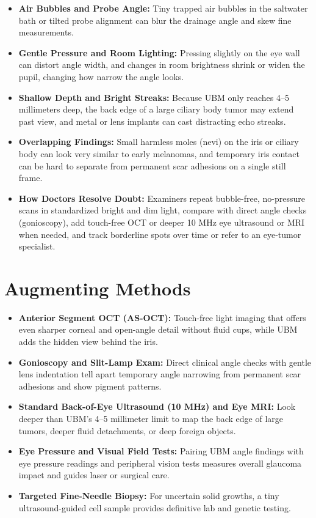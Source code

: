 \begin{itemize}
    \item \textbf{Air Bubbles and Probe Angle:} Tiny trapped air bubbles in the saltwater bath or tilted probe alignment can blur the drainage angle and skew fine measurements.
    \item \textbf{Gentle Pressure and Room Lighting:} Pressing slightly on the eye wall can distort angle width, and changes in room brightness shrink or widen the pupil, changing how narrow the angle looks.
    \item \textbf{Shallow Depth and Bright Streaks:} Because UBM only reaches 4--5 millimeters deep, the back edge of a large ciliary body tumor may extend past view, and metal or lens implants can cast distracting echo streaks.
    \item \textbf{Overlapping Findings:} Small harmless moles (nevi) on the iris or ciliary body can look very similar to early melanomas, and temporary iris contact can be hard to separate from permanent scar adhesions on a single still frame.
    \item \textbf{How Doctors Resolve Doubt:} Examiners repeat bubble-free, no-pressure scans in standardized bright and dim light, compare with direct angle checks (gonioscopy), add touch-free OCT or deeper 10 MHz eye ultrasound or MRI when needed, and track borderline spots over time or refer to an eye-tumor specialist.
\end{itemize}

\section{Augmenting Methods}

\begin{itemize}
    \item \textbf{Anterior Segment OCT (AS-OCT):} Touch-free light imaging that offers even sharper corneal and open-angle detail without fluid cups, while UBM adds the hidden view behind the iris.
    \item \textbf{Gonioscopy and Slit-Lamp Exam:} Direct clinical angle checks with gentle lens indentation tell apart temporary angle narrowing from permanent scar adhesions and show pigment patterns.
    \item \textbf{Standard Back-of-Eye Ultrasound (10 MHz) and Eye MRI:} Look deeper than UBM's 4--5 millimeter limit to map the back edge of large tumors, deeper fluid detachments, or deep foreign objects.
    \item \textbf{Eye Pressure and Visual Field Tests:} Pairing UBM angle findings with eye pressure readings and peripheral vision tests measures overall glaucoma impact and guides laser or surgical care.
    \item \textbf{Targeted Fine-Needle Biopsy:} For uncertain solid growths, a tiny ultrasound-guided cell sample provides definitive lab and genetic testing.
\end{itemize}

